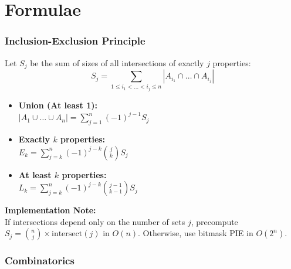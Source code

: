 \chapter{Formulae}


\subsection{Inclusion-Exclusion Principle}
Let $S_j$ be the sum of sizes of all intersections of exactly $j$ properties:
\[ S_j = \sum_{1 \le i_1 < \dots < i_j \le n} |A_{i_1} \cap \dots \cap A_{i_j}| \]

\begin{itemize}
    \item \textbf{Union (At least 1):} \\
    $|A_1 \cup \dots \cup A_n| = \sum_{j=1}^n (-1)^{j-1} S_j$
    
    \item \textbf{Exactly $k$ properties:} \\
    $E_k = \sum_{j=k}^n (-1)^{j-k} \binom{j}{k} S_j$
    
    \item \textbf{At least $k$ properties:} \\
    $L_k = \sum_{j=k}^n (-1)^{j-k} \binom{j-1}{k-1} S_j$
\end{itemize}

\textbf{Implementation Note:} \\
If intersections depend only on the number of sets $j$, precompute $S_j = \binom{n}{j} \times \text{intersect}(j)$ in $O(n)$. Otherwise, use bitmask PIE in $O(2^n)$.
\small
\subsection{Combinatorics}

